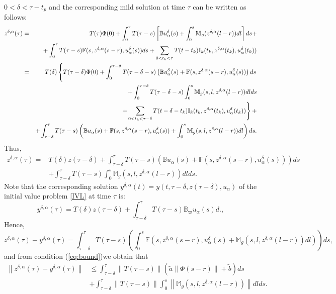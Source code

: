 \documentclass[11 pt]{amsart}
\begin{document}
 $0<\delta<\tau-t_{p}$ and the corresponding mild solution at time $\tau$ can be written as follows:
 \begin{eqnarray*}
 {\displaystyle}
z^{\delta,\alpha}(\tau) &=&
 {\displaystyle} T(\tau)\Phi(0) +\int_{0}^{\tau}T(\tau-s)
	\left[ {\mathbb{B}}   u_{\alpha}^{\delta} (s)
		+ \int_0^s {\mathbb{M}_g}(z^{\delta,\alpha}(l-r))dl\right]ds+ \\
	&&+  \int_{0}^{\tau}T(\tau-s){\mathbb{F}}(s,z^{\delta,\alpha}(s-r),u_{\alpha}^{\delta}(s))ds+
\sum_{0 < t_k < \tau} T(t-t_k ){\mathbb{I}}_{k}(t_k,z^{\delta,\alpha}(t_k), u_{\alpha}^{\delta}(t_k))\\
&=&T(\delta)\left\{T(\tau-\delta)\Phi(0)
+\int_{0}^{\tau-\delta}T(\tau-\delta-s) \left({\mathbb{B}}   u_{\alpha}^{\delta} (s)+{\mathbb{F}}(s,z^{\delta,\alpha}(s-r),u_{\alpha}^{\delta}(s))\right)ds\right.\\
&&\qquad\quad+\int_{0}^{\tau-\delta}T(\tau-\delta-s)  \int_0^s {\mathbb{M}_g}(s,l, z^{\delta,\alpha}(l-r))dlds\\
&&\qquad\quad\left.+ \sum_{0 < t_k < \tau-\delta} T(t-\delta-t_k ){\mathbb{I}}_{k}(t_k,z^{\delta,\alpha}(t_k), u_{\alpha}^{\delta}(t_k))\right\}+\\
&& + \int_{\tau-\delta}^{\tau}T(\tau-s)\left({\mathbb{B}} u_{\alpha}(s)+
{\mathbb{F}}(s,z^{\delta,\alpha}(s-r),u_{\alpha}^{\delta}(s))+\int_0^s{\mathbb{M}_g}(s,l,z^{\delta,\alpha}(l-r))dl\right)ds.
\end{eqnarray*}
Thus,
\begin{align*}
z^{\delta,\alpha}(\tau)  = &T(\delta)z(\tau-\delta)+ \int_{\tau-\delta}^{\tau}T(\tau-s)\left({\mathbb{B}} u_{\alpha}(s)+
{\mathbb{F}}(s,z^{\delta,\alpha}(s-r),u_{\alpha}^{\delta}(s))\right)ds \\
&+ \int_{\tau-\delta}^{\tau}T(\tau-s)\int_0^s{\mathbb{M}_g}(s,l,z^{\delta,\alpha}(l-r))dlds.
\end{align*}
Note that the corresponding solution $y^{\delta,\alpha}(t)=y(t,\tau-\delta,z(\tau-\delta),u_{\alpha})$ of the initial value problem \eqref{IVL} at time $\tau$ is:
$$
y^{\delta,\alpha}(\tau)=T(\delta)z(\tau-\delta)+ \int_{\tau-\delta}^{\tau}T(\tau-s){\mathbb{B}}_{\varpi} u_{\alpha}(s)d.,
$$
Hence,
$$
z^{\delta,\alpha}(\tau)-y^{\delta,\alpha}(\tau)=
\int_{\tau-\delta}^{\tau}T(\tau-s)\left(\int_{0}^{s}{\mathbb{F}}(s,z^{\delta,\alpha}(s-r),u_{\alpha}^{\delta}(s)+{\mathbb{M}_g}(s,l,z^{\delta,\alpha}(l-r))dl)\right)ds,
$$
 and from condition (\ref{eq:bound})we obtain that
\begin{align*}
  {\left\| { z^{\delta,\alpha}(\tau)-y^{\delta,\alpha}(\tau)}\right\|} & \leq \int_{\tau-\delta}^{\tau} {\left\| { T(\tau-s)}\right\|}\left( \tilde{a}{\left\| {\Phi(s-r)}\right\|}+\tilde{b}\right)ds \\
   & +  \int_{\tau-\delta}^{\tau}{\left\| { T(\tau-s)}\right\|}\int_{0}^{s}{\left\| {{\mathbb{M}_g}(s,l,z^{\delta,\alpha}(l-r))}\right\|}dlds.
\end{align*}
\end{document}

